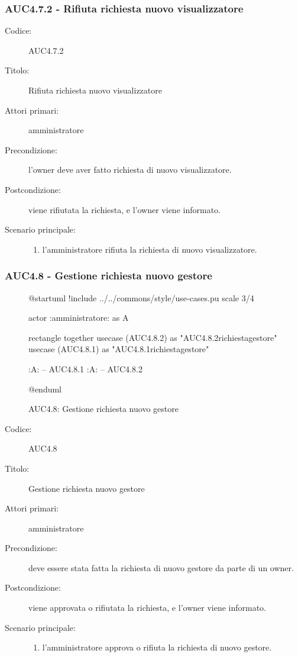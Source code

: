 \documentclass[casi-duso]{subfiles}
\begin{document}
\subsubsection{AUC4.7.2 - Rifiuta richiesta nuovo visualizzatore}%
\label{subsub:AUC4.7.2}
\begin{description}
  \item[Codice:] AUC4.7.2
  \item[Titolo:] Rifiuta richiesta nuovo visualizzatore
  \item[Attori primari:] amministratore
  \item[Precondizione:] l'owner deve aver fatto richiesta di nuovo visualizzatore.
  \item[Postcondizione:] viene rifiutata la richiesta, e l'owner viene informato.
  \item[Scenario principale:]
  \begin{enumerate}
    \item l'amministratore rifiuta la richiesta di nuovo visualizzatore.
  \end{enumerate}
\end{description}

\subsubsection{AUC4.8 - Gestione richiesta nuovo gestore}%
\label{subsub:AUC4.8}

\begin{figure}[h!]
  \centering
  \begin{plantuml}
  @startuml
  !include ../../commons/style/use-cases.pu
  scale 3/4

  actor :amministratore: as A

  rectangle {
    together {
      usecase (AUC4.8.2) as "AUC4.8.2\nRifiuta richiesta\nnuovo gestore"
      usecase (AUC4.8.1) as "AUC4.8.1\nAccetta richiesta\nnuovo gestore"
    }
  }

  :A: -- AUC4.8.1
  :A: -- AUC4.8.2

  @enduml
  \end{plantuml}
  \caption{AUC4.8: Gestione richiesta nuovo gestore}
  \label{fig:auc4_8}
\end{figure}

\begin{description}
  \item[Codice:] AUC4.8
  \item[Titolo:] Gestione richiesta nuovo gestore
  \item[Attori primari:] amministratore
  \item[Precondizione:] deve essere stata fatta la richiesta di nuovo gestore da parte di un owner.
  \item[Postcondizione:] viene approvata o rifiutata la richiesta, e l'owner viene informato.
  \item[Scenario principale:]
  \begin{enumerate}
    \item l'amministratore approva o rifiuta la richiesta di nuovo gestore.
  \end{enumerate}
\end{description}
\end{document}
